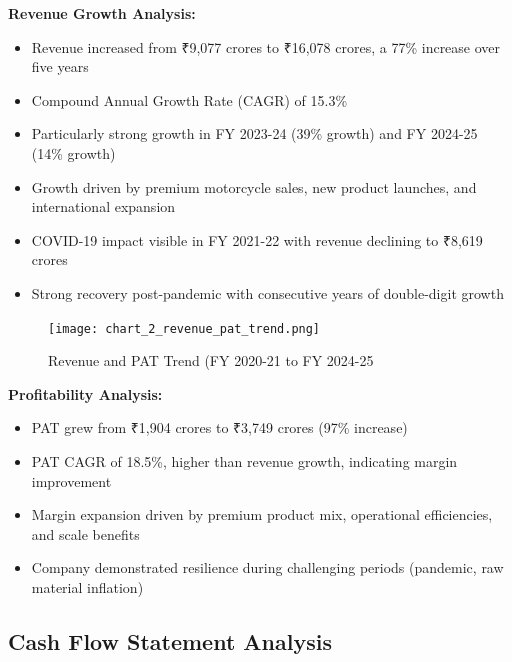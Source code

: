 \documentclass[8pt,a4paper]{article}
\begin{document}
\textbf{Revenue Growth Analysis:}
\begin{itemize}
    \item Revenue increased from ₹9,077 crores to ₹16,078 crores, a 77\% increase over five years
    \item Compound Annual Growth Rate (CAGR) of 15.3\%
    \item Particularly strong growth in FY 2023-24 (39\% growth) and FY 2024-25 (14\% growth)
    \item Growth driven by premium motorcycle sales, new product launches, and international expansion
    \item COVID-19 impact visible in FY 2021-22 with revenue declining to ₹8,619 crores
    \item Strong recovery post-pandemic with consecutive years of double-digit growth
\end{itemize}


\begin{figure}[H]
\centering
\texttt{[image: chart\_2\_revenue\_pat\_trend.png]}
\caption{Revenue and PAT Trend (FY 2020-21 to FY 2024-25}
\label{fig:assets_growth}
\end{figure}

\textbf{Profitability Analysis:}
\begin{itemize}
    \item PAT grew from ₹1,904 crores to ₹3,749 crores (97\% increase)
    \item PAT CAGR of 18.5\%, higher than revenue growth, indicating margin improvement
    \item Margin expansion driven by premium product mix, operational efficiencies, and scale benefits
    \item Company demonstrated resilience during challenging periods (pandemic, raw material inflation)
\end{itemize}

\subsection{Cash Flow Statement Analysis}
\end{document}
